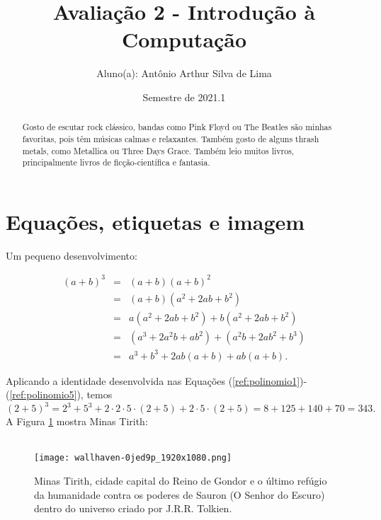\documentclass[11pt]{article}
\title{Avaliação 2 - Introdução à Computação}
\author{Aluno(a): Antônio Arthur Silva de Lima}
\date{Semestre de 2021.1}
\begin{document}
\maketitle

\begin{abstract}
    Gosto de escutar rock clássico, bandas como Pink Floyd ou The Beatles são minhas favoritas, pois têm músicas calmas e relaxantes. Também gosto de alguns thrash metals, como Metallica ou Three Days Grace. Também leio muitos livros, principalmente livros de ficção-científica e fantasia.
\end{abstract}

\section{Equações, etiquetas e imagem}

\noindent Um pequeno desenvolvimento: 

\begin{eqnarray}
(a + b)^3 &=& \label{ref:polinomio1}
(a + b)(a + b)^2 \\ 
&=& (a + b)(a^2 + 2ab + b^2) \\
&=& a(a^2 + 2ab + b^2) + b(a^2 + 2ab + b^2) \\
&=& (a^3 + 2a^2b + ab^2) + (a^2b + 2ab^2 + b^3) \\
&=& a^3 + b^3 + 2ab(a + b) + ab(a + b). \label{ref:polinomio5}
\end{eqnarray}


Aplicando a identidade desenvolvida nas Equações (\ref{ref:polinomio1})-(\ref{ref:polinomio5}), temos \\

\noindent $(2+5)^3 = 2^3 + 5^3 + 2 \cdot 2 \cdot 5 \cdot (2+5) + 2 \cdot 5 \cdot (2+5) = 8 + 125 + 140 + 70 = 343.$ \\
    
A Figura \ref{fig:minastirith} mostra Minas Tirith: \\\\

\begin{figure}[H]
    \centering
    \texttt{[image: wallhaven-0jed9p\_1920x1080.png]}
    \caption{Minas Tirith, cidade capital do Reino de Gondor e o último refúgio da humanidade contra os poderes de Sauron (O Senhor do Escuro) dentro do universo criado por J.R.R. Tolkien.}
    \label{fig:minastirith}
\end{figure}
\end{document}
